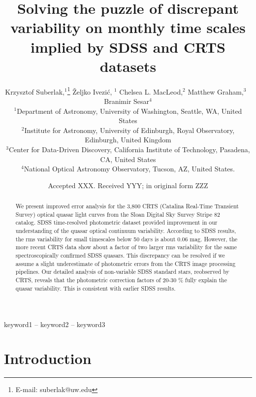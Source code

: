 \documentclass[a4paper,fleqn,usenatbib]{mnras}
\title[Quasar Variability]{Solving the puzzle of discrepant variability on monthly time scales implied by SDSS and CRTS datasets}
\author[K. Suberlak et al.]{
Krzysztof Suberlak,$^{1}$\thanks{E-mail: suberlak@uw.edu}
\v{Z}eljko Ivezi\'c, $^{1}$
Chelsea L. MacLeod,$^{2}$
Matthew Graham,$^{3}$ 
\newauthor
$\, \,  $Branimir Sesar$^{4}$
\\
$^{1}$Department of Astronomy, University of Washington, Seattle, WA, United States\\
$^{2}$Institute for Astronomy, University of Edinburgh, Royal Observatory, Edinburgh, United Kingdom\\
$^{3}$Center for Data-Driven Discovery, California Institute of Technology, Pasadena, CA, United States\\
$^{4}$National Optical Astronomy Observatory, Tucson, AZ, United States.
}
\date{Accepted XXX. Received YYY; in original form ZZZ}
\begin{document}
\label{firstpage}
\pagerange{\pageref{firstpage}--\pageref{lastpage}}
\maketitle

\begin{abstract}

We present improved error analysis for the 3,800 CRTS (Catalina Real-Time Transient Survey) optical quasar light curves from the Sloan Digital Sky Survey Stripe 82 catalog. SDSS time-resolved photometric dataset provided improvement in our understanding of the quasar optical continuum variability. According to SDSS results, the rms variability for small timescales  below 50 days is about 0.06 mag. However,  the more recent CRTS data show about a factor of two larger rms variability for the same spectroscopically confirmed SDSS quasars.  This discrepancy can be resolved if we assume a slight underestimate of photometric errors from the CRTS image processing pipelines. Our detailed analysis of non-variable SDSS standard stars, reobserved by CRTS, reveals that the photometric correction factors of 20-30 \% fully explain the quasar variability. This is consistent with earlier SDSS results.

\end{abstract}

\begin{keywords}
keyword1 -- keyword2 -- keyword3
\end{keywords}



\section{Introduction}
\label{sec:intro}
\end{document}
